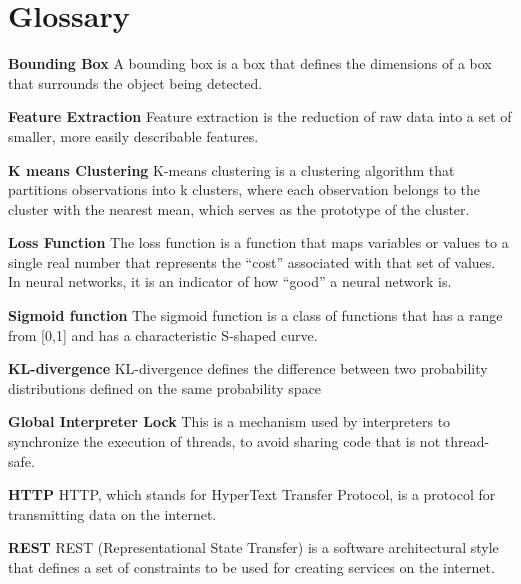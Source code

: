 \documentclass[12pt,letterpaper]{article}
\begin{document}
\pagebreak



\section*{Glossary}
\label{sec:glossary}

\textbf{Bounding Box} A bounding box is a box that defines the dimensions of a box that surrounds the object being detected.

\noindent \textbf{Feature Extraction} Feature extraction is the reduction of raw data into a set of smaller, more easily describable features.

\noindent \textbf{K means Clustering} K-means clustering is a clustering algorithm that partitions observations into k clusters, where each observation belongs to the cluster with the nearest mean, which serves as the prototype of the cluster.

\noindent \textbf{Loss Function} The loss function is a function that maps variables or values to a single real number that represents the “cost” associated with that set of values. In neural networks, it is an indicator of how “good” a neural network is.

\noindent \textbf{Sigmoid function} The sigmoid function is a class of functions that has a range from [0,1] and has a characteristic S-shaped curve.

\noindent \textbf{KL-divergence} KL-divergence defines the difference between two probability distributions defined on the same probability space

\noindent \textbf{Global Interpreter Lock} This is a mechanism used by interpreters to synchronize the execution of threads, to avoid sharing code that is not thread-safe.

\noindent \textbf{HTTP} HTTP, which stands for HyperText Transfer Protocol, is a protocol for transmitting data on the internet.

\noindent \textbf{REST} REST (Representational State Transfer) is a software architectural style that defines a set of constraints to be used for creating services on the internet.

\pagebreak
\end{document}
